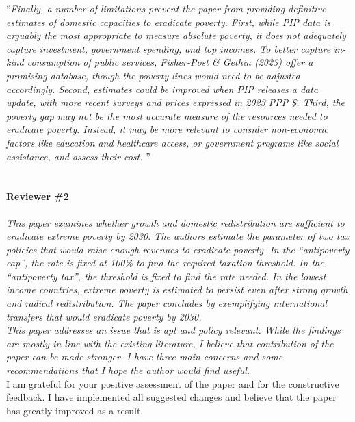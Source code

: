 \documentclass[12pt,english]{article}
\begin{document}
``\textit{Finally, a number of limitations prevent the paper from providing definitive estimates of domestic capacities to eradicate poverty. First, while PIP data is arguably the most appropriate to measure absolute poverty, it does not adequately capture investment, government spending, and top incomes. To better capture in-kind consumption of public services, Fisher-Post \& Gethin (2023) offer a promising database, though the poverty lines would need to be adjusted accordingly. Second, estimates could be improved when PIP releases a data update, with more recent surveys and prices expressed in 2023 PPP \$. Third, the poverty gap may not be the most accurate measure of the resources needed to eradicate poverty. Instead, it may be more relevant to consider non-economic factors like education and healthcare access, or government programs like social assistance, and assess their cost. }''
~\\ ~\\


\paragraph*{Reviewer \#2}

\textit{This paper examines whether growth and domestic redistribution are sufficient to eradicate extreme poverty by 2030. The authors estimate the parameter of two tax policies that would raise enough revenues to eradicate poverty. In the “antipoverty cap”, the rate is fixed at 100\% to find the required taxation threshold. In the “antipoverty tax”, the threshold is fixed to find the rate needed. In the lowest income countries, extreme poverty is estimated to persist even after strong growth and radical redistribution. The paper concludes by exemplifying international transfers that would eradicate poverty by 2030. }~\\

\textit{This paper addresses an issue that is apt and policy relevant. While the findings are mostly in line with the existing literature, I believe that contribution of the paper can be made stronger. I have three main concerns and some recommendations that I hope the author would find useful. }~\\

I am grateful for your positive assessment of the paper and for the constructive feedback. I have implemented all suggested changes and believe that the paper has greatly improved as a result.
~\\ ~\\
 
\end{document}
